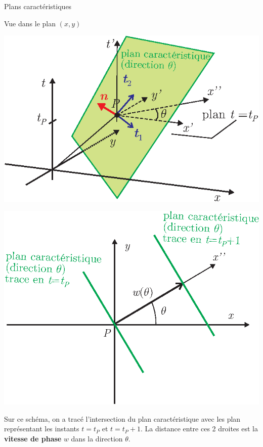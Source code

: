 \documentclass[
mode=present,    %
paper=a4paper,   %
orient=landscape,
display=slides,   %
size=10pt,
style=romain   %
]{powerdot}
\begin{document}
\begin{slide}[toc=]{Plans caractéristiques}

Vue dans le plan $(x,y)$

\bigskip

\begin{minipage}[l]{0.4\textwidth}
    \centerline{\includegraphics[width=\textwidth]{plancarac.eps} }
\end{minipage}
\begin{minipage}[l]{0.6\textwidth-1cm}
    \centerline{\includegraphics[width=\textwidth]{plancarac3.eps} }
\end{minipage}

\bigskip

Sur ce schéma, on a tracé l'intersection du plan caractéristique avec les plan représentant les instants $t=t_P$ et $t=t_P+1$. La distance entre ces 2 droites est la \textbf{vitesse de phase} $w$ dans la direction $\theta$.

\end{slide}
\end{document}
